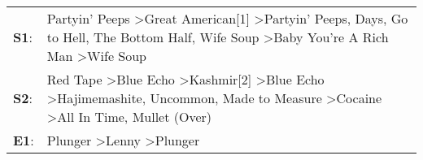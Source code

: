 \begin{supertabular}{p{0.03\textwidth}p{0.92\textwidth}}
 \textbf{S1}:  &                                         Partyin' Peeps\textsuperscript{} \textgreater \enspace Great American[1]\textsuperscript{} \textgreater \enspace Partyin' Peeps\textsuperscript{},  Days\textsuperscript{}, \enspace Go to Hell\textsuperscript{}, \enspace The Bottom Half\textsuperscript{}, \enspace Wife Soup\textsuperscript{} \textgreater \enspace Baby You're A Rich Man\textsuperscript{} \textgreater \enspace Wife Soup\textsuperscript{}  \enspace  \\
 \textbf{S2}:  &  Red Tape\textsuperscript{} \textgreater \enspace Blue Echo\textsuperscript{} \textgreater \enspace Kashmir[2]\textsuperscript{} \textgreater \enspace Blue Echo\textsuperscript{} \textgreater \enspace Hajimemashite\textsuperscript{}, \enspace Uncommon\textsuperscript{}, \enspace Made to Measure\textsuperscript{} \textgreater \enspace Cocaine\textsuperscript{} \textgreater \enspace All In Time\textsuperscript{}, \enspace Mullet (Over)\textsuperscript{}  \enspace  \\
 \textbf{E1}:  &                                                                                                                                                                                                                                                                                                                                                 Plunger\textsuperscript{} \textgreater \enspace Lenny\textsuperscript{} \textgreater \enspace Plunger\textsuperscript{}  \enspace  \\
\end{supertabular}
